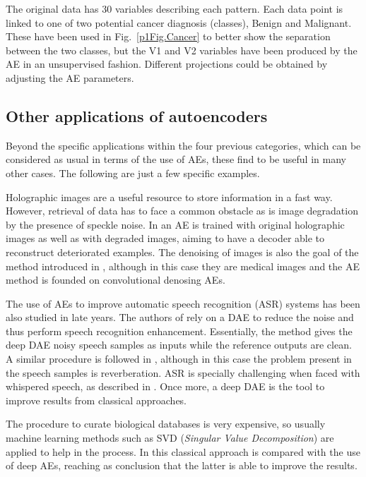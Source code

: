 The original data  has 30 variables describing each pattern. Each data point is linked to one of two potential cancer diagnosis (classes), Benign and Malignant. These have been used in Fig.~\ref{p1Fig.Cancer} to better show the separation between the two classes, but the V1 and V2 variables have been produced by the AE in an unsupervised fashion. Different projections could be obtained by adjusting the AE parameters.

\subsection{Other applications of autoencoders}
Beyond the specific applications within the four previous categories, which can be considered as usual in terms of the use of AEs, these find to be useful in many other cases. The following are just a few specific examples.

Holographic images  are a useful resource to store information in a fast way. However, retrieval of data has to face a common obstacle as is image degradation by the presence of speckle noise. In  an AE is trained with original holographic images as well as with degraded images, aiming to have a decoder able to reconstruct deteriorated examples. The denoising of images is also the goal of the method introduced in , although in this case they are medical images and the AE method is founded on convolutional denosing AEs.

The use of AEs to improve automatic speech recognition (ASR) systems has been also studied in late years. The authors of  rely on a DAE to reduce the noise and thus perform speech recognition enhancement. Essentially, the method gives the deep DAE noisy speech samples as inputs while the reference outputs are clean. A similar procedure is followed in , although in this case the problem present in the speech samples is reverberation. ASR is specially challenging when faced with whispered speech, as described in . Once more, a deep DAE is the tool to improve results from classical approaches.

The procedure to curate biological databases is very expensive, so usually machine learning methods such as SVD (\textit{Singular Value Decomposition})  are applied to help in the process. In  this classical approach is compared with the use of deep AEs, reaching as conclusion that the latter is able to improve the results.

